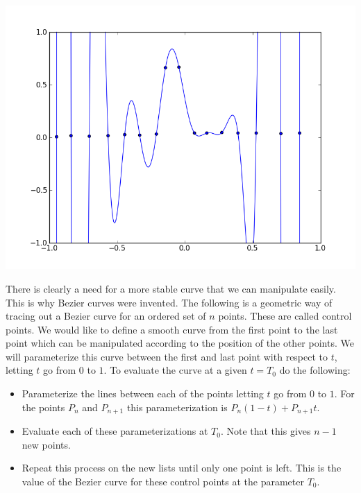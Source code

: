 \includegraphics[width=\textwidth]{bad_interpolation2}

There is clearly a need for a more stable curve that we can manipulate easily. This is why Bezier curves were invented. The following is a geometric way of tracing out a Bezier curve for an ordered set of $n$ points. These are called control points. We would like to define a smooth curve from the first point to the last point which can be manipulated according to the position of the other points. We will parameterize this curve between the first and last point with respect to $t$, letting $t$ go from $0$ to $1$. To evaluate the curve at a given $t=T_0$ do the following:
\begin{itemize}

\item

Parameterize the lines between each of the points letting $t$ go from $0$ to $1$. For the points $P_{n}$ and $P_{n+1}$ this parameterization is $P_{n} (1-t) + P_{n+1} t$.

\item

Evaluate each of these parameterizations at $T_0$. Note that this gives $n-1$ new points.

\item

Repeat this process on the new lists until only one point is left. This is the value of the Bezier curve for these control points at the parameter $T_0$.

\end{itemize}

